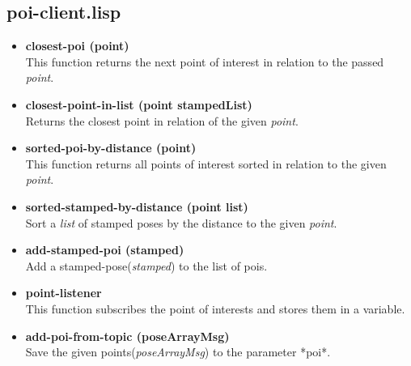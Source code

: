 \documentclass[main.tex]{subfiles}
\begin{document}
        \subsection{poi-client.lisp}
         \begin{itemize}
            \item \textbf{closest-poi (point)} \\
            This function returns the next point of interest in relation to the passed \textit{point}.
            \item \textbf{closest-point-in-list (point stampedList)} \\
            Returns the closest point in relation of the given \textit{point}.
            \item \textbf{sorted-poi-by-distance (point)} \\
            This function returns all points of interest sorted in relation to the given \textit{point}.
            \item \textbf{sorted-stamped-by-distance (point list)} \\
            Sort a \textit{list} of stamped poses by the distance to the given \textit{point}.
            \item \textbf{add-stamped-poi (stamped)} \\
            Add a stamped-pose(\textit{stamped}) to the list of pois.
            \item \textbf{point-listener} \\
            This function subscribes the point of interests and stores them in a variable.
            \item \textbf{add-poi-from-topic (poseArrayMsg)} \\
            Save the given points(\textit{poseArrayMsg}) to the parameter *poi*.
        \end{itemize}
\end{document}
